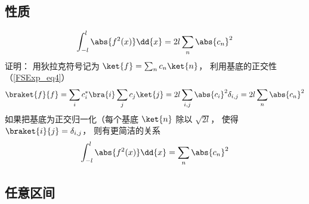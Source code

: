 \subsection{性质}
\begin{equation}
\int_{-l}^l \abs{f^2(x)} \dd{x} =  2l\sum_n \abs{c_n}^2
\end{equation}
证明： 用狄拉克符号记为 $\ket{f} = \sum_n c_n \ket{n}$， 利用基底的正交性（\autoref{FSExp_eq4}）
\begin{equation}
\braket{f}{f} = \sum_i c_i^* \bra{i} \sum_j c_j \ket{j} = 2l \sum_{i,j} \abs{c_i}^2 \delta_{i,j} = 2l \sum_n \abs{c_n}^2
\end{equation}
如果把基底为正交归一化（每个基底 $\ket{n}$ 除以 $\sqrt{2l}$， 使得 $\braket{i}{j} = \delta_{i,j}$， 则有更简洁的关系
\begin{equation}\label{FSExp_eq5}
\int_{-l}^l \abs{f^2(x)} \dd{x} =  \sum_n \abs{c_n}^2
\end{equation}

\subsection{任意区间}
